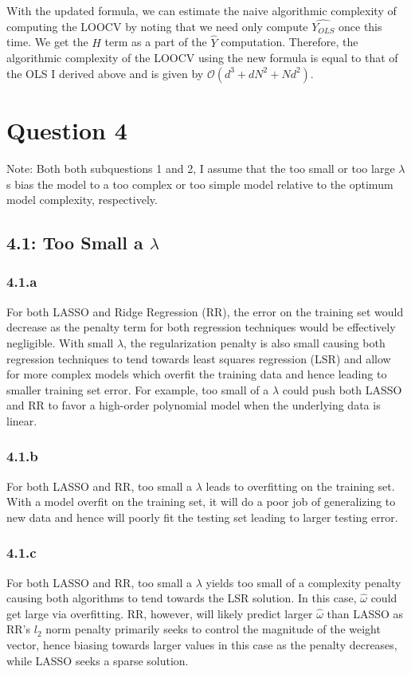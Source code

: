 \documentclass[12pt]{amsart}
\begin{document}
With the updated formula, we can estimate the naive algorithmic complexity of computing the LOOCV by noting that we need only compute $\hat{Y_{OLS}}$ once this time.  We get the $H$ term as a part of the $\hat{Y}$ computation.  Therefore, the algorithmic complexity of the LOOCV using the new formula is equal to that of the OLS I derived above and is given by $\mathcal{O}(d^3 + dN^2 + Nd^2)$.


\section*{Question 4}

Note: Both both subquestions 1 and 2, I assume that the too small or too large $\lambda$s bias the model to a too complex or too simple model relative to the optimum model complexity, respectively.

\subsection*{4.1: Too Small a $\lambda$}
\subsubsection*{4.1.a}
For both LASSO and Ridge Regression (RR), the error on the training set would decrease as the penalty term for both regression techniques would be effectively negligible.  With small $\lambda$, the regularization penalty is also small causing both regression techniques to tend towards least squares regression (LSR) and allow for more complex models which overfit the training data and hence leading to smaller training set error.  For example, too small of a $\lambda$ could push both LASSO and RR to favor a high-order polynomial model when the underlying data is linear.

\subsubsection*{4.1.b}
For both LASSO and RR, too small a $\lambda$ leads to overfitting on the training set.  With a model overfit on the training set, it will do a poor job of generalizing to new data and hence will poorly fit the testing set leading to larger testing error.

\subsubsection*{4.1.c}
For both LASSO and RR, too small a $\lambda$ yields too small of a complexity penalty causing both algorithms to tend towards the LSR solution.  In this case, $\hat{\omega}$ could get large via overfitting.  RR, however, will likely predict larger $\hat{\omega}$ than LASSO as RR's $l_2$ norm penalty primarily seeks to control the magnitude of the weight vector, hence biasing towards larger values in this case as the penalty decreases, while LASSO seeks a sparse solution.
\end{document}
